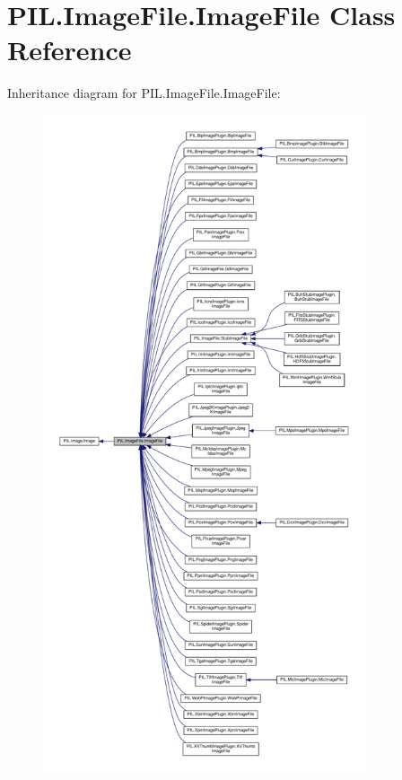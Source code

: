 \hypertarget{classPIL_1_1ImageFile_1_1ImageFile}{}\section{P\+I\+L.\+Image\+File.\+Image\+File Class Reference}
\label{classPIL_1_1ImageFile_1_1ImageFile}


Inheritance diagram for P\+I\+L.\+Image\+File.\+Image\+File\+:
\nopagebreak
\begin{figure}[H]
\begin{center}
\leavevmode
\includegraphics[height=550pt]{classPIL_1_1ImageFile_1_1ImageFile__inherit__graph}
\end{center}
\end{figure}


